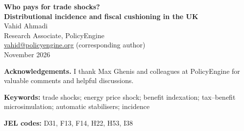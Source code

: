 \documentclass[11pt]{article}
\begin{document}
\begin{center}
{\Large\bfseries Who pays for trade shocks?\\[0.15cm]
Distributional incidence and fiscal cushioning in the UK}\\[1cm]
{\large Vahid Ahmadi}\\[0.2cm]
Research Associate, PolicyEngine\\
\href{mailto:vahid@policyengine.org}{vahid@policyengine.org} (corresponding author)\\[0.2cm]
November 2026
\end{center}
\vspace{1cm}
\noindent\textbf{Acknowledgements.} I thank Max Ghenis and colleagues
at PolicyEngine for valuable comments and helpful discussions.

\medskip
\noindent\textbf{Keywords:} trade shocks; energy price shock; benefit
indexation; tax--benefit microsimulation; automatic stabilisers;
incidence

\medskip
\noindent\textbf{JEL codes:} D31, F13, F14, H22, H53, I38
\end{document}
